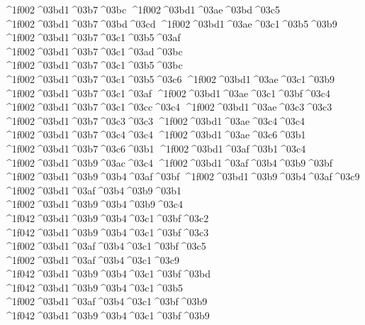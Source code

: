 {^^^^1f002^^^^03bd1^^^^03b7^^^^03bc
^^^^1f002^^^^03bd1^^^^03ae^^^^03bd^^^^03c5   		%
^^^^1f002^^^^03bd1^^^^03b7^^^^03bd^^^^03cd
^^^^1f002^^^^03bd1^^^^03ae^^^^03c1^^^^03b5^^^^03b9  		%
^^^^1f002^^^^03bd1^^^^03b7^^^^03c1^^^^03b5^^^^03af
^^^^1f002^^^^03bd1^^^^03b7^^^^03c1^^^^03ad^^^^03bc  		%
^^^^1f002^^^^03bd1^^^^03b7^^^^03c1^^^^03b5^^^^03bc
^^^^1f002^^^^03bd1^^^^03b7^^^^03c1^^^^03b5^^^^03c6   		%
^^^^1f002^^^^03bd1^^^^03ae^^^^03c1^^^^03b9   		%
^^^^1f002^^^^03bd1^^^^03b7^^^^03c1^^^^03af
^^^^1f002^^^^03bd1^^^^03ae^^^^03c1^^^^03bf^^^^03c4  		%
^^^^1f002^^^^03bd1^^^^03b7^^^^03c1^^^^03cc^^^^03c4
^^^^1f002^^^^03bd1^^^^03ae^^^^03c3^^^^03c3   		%
^^^^1f002^^^^03bd1^^^^03b7^^^^03c3^^^^03c3
^^^^1f002^^^^03bd1^^^^03ae^^^^03c4^^^^03c4   		%
^^^^1f002^^^^03bd1^^^^03b7^^^^03c4^^^^03c4
^^^^1f002^^^^03bd1^^^^03ae^^^^03c6^^^^03b1  		%
^^^^1f002^^^^03bd1^^^^03b7^^^^03c6^^^^03b1
^^^^1f002^^^^03bd1^^^^03af^^^^03b1^^^^03c4   		%
^^^^1f002^^^^03bd1^^^^03b9^^^^03ac^^^^03c4
^^^^1f002^^^^03bd1^^^^03af^^^^03b4^^^^03b9^^^^03bf    		%
^^^^1f002^^^^03bd1^^^^03b9^^^^03b4^^^^03af^^^^03bf
^^^^1f002^^^^03bd1^^^^03b9^^^^03b4^^^^03af^^^^03c9
^^^^1f002^^^^03bd1^^^^03af^^^^03b4^^^^03b9^^^^03b1
^^^^1f002^^^^03bd1^^^^03b9^^^^03b4^^^^03b9^^^^03c4    		%
^^^^1f042^^^^03bd1^^^^03b9^^^^03b4^^^^03c1^^^^03bf^^^^03c2 		%
^^^^1f042^^^^03bd1^^^^03b9^^^^03b4^^^^03c1^^^^03bf^^^^03c3
^^^^1f002^^^^03bd1^^^^03af^^^^03b4^^^^03c1^^^^03bf^^^^03c5
^^^^1f002^^^^03bd1^^^^03af^^^^03b4^^^^03c1^^^^03c9
^^^^1f042^^^^03bd1^^^^03b9^^^^03b4^^^^03c1^^^^03bf^^^^03bd
^^^^1f042^^^^03bd1^^^^03b9^^^^03b4^^^^03c1^^^^03b5
^^^^1f002^^^^03bd1^^^^03af^^^^03b4^^^^03c1^^^^03bf^^^^03b9
^^^^1f042^^^^03bd1^^^^03b9^^^^03b4^^^^03c1^^^^03bf^^^^03b9
}
